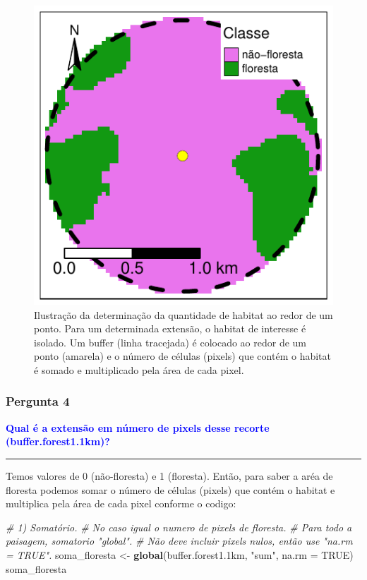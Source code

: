 \documentclass[
]{article}
\newenvironment{Shaded}{\begin{snugshade}}{\end{snugshade}}
\newcommand{\AttributeTok}[1]{\textcolor[rgb]{0.13,0.29,0.53}{#1}}
\newcommand{\CommentTok}[1]{\textcolor[rgb]{0.56,0.35,0.01}{\textit{#1}}}
\newcommand{\ConstantTok}[1]{\textcolor[rgb]{0.56,0.35,0.01}{#1}}
\newcommand{\FloatTok}[1]{\textcolor[rgb]{0.00,0.00,0.81}{#1}}
\newcommand{\FunctionTok}[1]{\textcolor[rgb]{0.13,0.29,0.53}{\textbf{#1}}}
\newcommand{\NormalTok}[1]{#1}
\newcommand{\OtherTok}[1]{\textcolor[rgb]{0.56,0.35,0.01}{#1}}
\newcommand{\StringTok}[1]{\textcolor[rgb]{0.31,0.60,0.02}{#1}}
\begin{document}
\begin{figure}
\centering
\includegraphics{epr_files/figure-latex/unnamed-chunk-18-1.pdf}
\caption{\label{fig:unnamed-chunk-18}Ilustração da determinação da quantidade de habitat ao redor de um ponto. Para um determinada extensão, o habitat de interesse é isolado. Um buffer (linha tracejada) é colocado ao redor de um ponto (amarela) e o número de células (pixels) que contém o habitat é somado e multiplicado pela área de cada pixel.}
\end{figure}

\hypertarget{pergunta-4}{%
\subsubsection{Pergunta 4}\label{pergunta-4}}

\textcolor{blue}{\textbf{Qual é a extensão em número de pixels desse recorte (buffer.forest1.1km)?}}

\begin{center}\rule{0.5\linewidth}{0.5pt}\end{center}

\newpage

Temos valores de 0 (não-floresta) e 1 (floresta). Então, para saber a aréa de floresta podemos somar o número de células (pixels) que contém o habitat e multiplica pela área de cada pixel conforme o codigo:

\begin{Shaded}
\begin{Highlighting}[]
\CommentTok{\# 1) Somatório. }
\CommentTok{\# No caso igual o numero de pixels de floresta. }
\CommentTok{\# Para todo a paisagem, somatorio "global".}
\CommentTok{\# Não deve incluir pixels nulos, então use "na.rm = TRUE".}
\NormalTok{soma\_floresta }\OtherTok{\textless{}{-}} \FunctionTok{global}\NormalTok{(buffer.forest1}\FloatTok{.1}\NormalTok{km, }\StringTok{"sum"}\NormalTok{, }\AttributeTok{na.rm =} \ConstantTok{TRUE}\NormalTok{) }
\NormalTok{soma\_floresta}
\end{Highlighting}
\end{Shaded}
\end{document}
